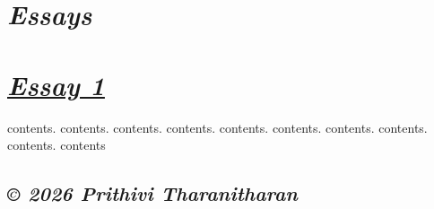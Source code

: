 \documentclass[12pt]{article}
\begin{document}
\section*{\textit{Essays}}

\section*{\href{/index.html}{\textit{Essay 1}}}
contents. contents. contents. contents. contents. contents. contents. contents. contents. contents

\subsection*{\textit{© 2026 Prithivi Tharanitharan}}
\end{document}

